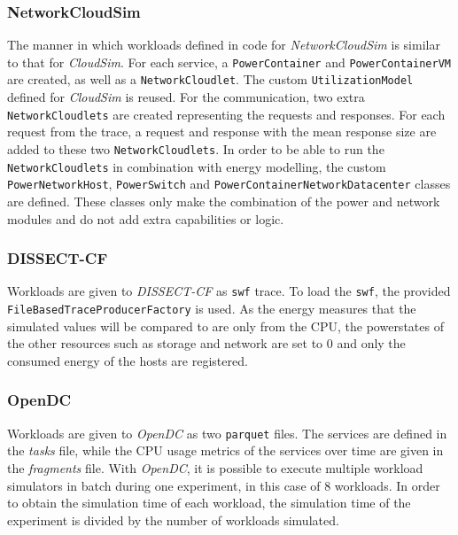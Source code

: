 \subsubsection{NetworkCloudSim} 
The manner in which workloads defined in code for \textit{NetworkCloudSim} is similar to that for \textit{CloudSim}. For each service, a \verb|PowerContainer| and \verb|PowerContainerVM| are created, as well as a \verb|NetworkCloudlet|. The custom \verb|UtilizationModel| defined for \textit{CloudSim} is reused. For the communication, two extra \verb|NetworkCloudlets| are created representing the requests and responses. For each request from the trace, a request and response with the mean response size are added to these two \verb|NetworkCloudlets|. In order to be able to run the \verb|NetworkCloudlets| in combination with energy modelling, the custom \verb|PowerNetworkHost|, \verb|PowerSwitch| and \verb|PowerContainerNetworkDatacenter| classes are defined. These classes only make the combination of the power and network modules and do not add extra capabilities or logic.

\subsubsection{DISSECT-CF}
Workloads are given to \textit{DISSECT-CF} as \texttt{swf} trace. To load the \texttt{swf}, the provided \verb|FileBasedTraceProducerFactory| is used. As the energy measures that the simulated values will be compared to are only from the CPU, the powerstates of the other resources such as storage and network are set to 0 and only the consumed energy of the hosts are registered.

\subsubsection{OpenDC}
Workloads are given to \textit{OpenDC} as two \texttt{parquet} files. The services are defined in the \textit{tasks} file, while the CPU usage metrics of the services over time are given in the \textit{fragments} file. With \textit{OpenDC}, it is possible to execute multiple workload simulators in batch during one experiment, in this case of 8 workloads. In order to obtain the simulation time of each workload, the simulation time of the experiment is divided by the number of workloads simulated.

